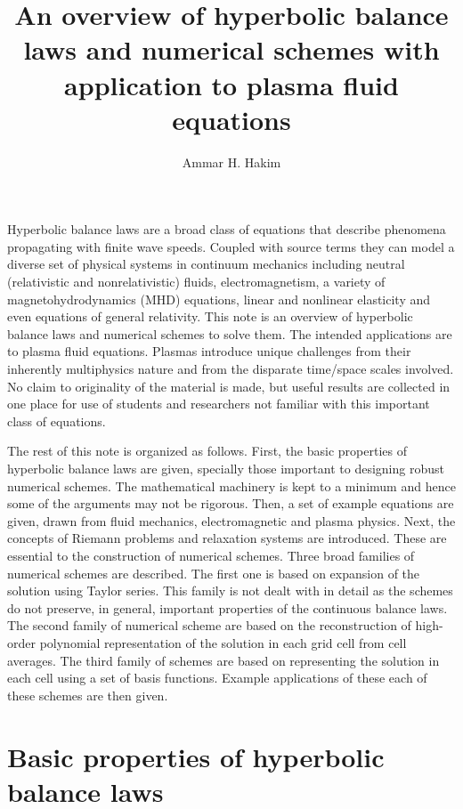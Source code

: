 \documentclass[11pt, reqno]{amsart}
\title{An overview of hyperbolic balance laws and numerical schemes
  with application to plasma fluid equations}%
\author{Ammar H. Hakim}%
\date{}
\theoremstyle{definition}
\begin{document}
\maketitle

Hyperbolic balance laws are a broad class of equations that describe
phenomena propagating with finite wave speeds. Coupled with source
terms they can model a diverse set of physical systems in continuum
mechanics including neutral (relativistic and nonrelativistic) fluids,
electromagnetism, a variety of magnetohydrodynamics (MHD) equations,
linear and nonlinear elasticity and even equations of general
relativity. This note is an overview of hyperbolic balance laws and
numerical schemes to solve them. The intended applications are to
plasma fluid equations. Plasmas introduce unique challenges from their
inherently multiphysics nature and from the disparate time/space
scales involved. No claim to originality of the material is made, but
useful results are collected in one place for use of students and
researchers not familiar with this important class of equations.

The rest of this note is organized as follows. First, the basic
properties of hyperbolic balance laws are given, specially those
important to designing robust numerical schemes. The mathematical
machinery is kept to a minimum and hence some of the arguments may not
be rigorous. Then, a set of example equations are given, drawn from
fluid mechanics, electromagnetic and plasma physics. Next, the
concepts of Riemann problems and relaxation systems are
introduced. These are essential to the construction of numerical
schemes. Three broad families of numerical schemes are described. The
first one is based on expansion of the solution using Taylor
series. This family is not dealt with in detail as the schemes do not
preserve, in general, important properties of the continuous balance
laws. The second family of numerical scheme are based on the
reconstruction of high-order polynomial representation of the solution
in each grid cell from cell averages. The third family of schemes are
based on representing the solution in each cell using a set of basis
functions. Example applications of these each of these schemes are
then given.

\section{Basic properties of hyperbolic balance laws}
\end{document}
